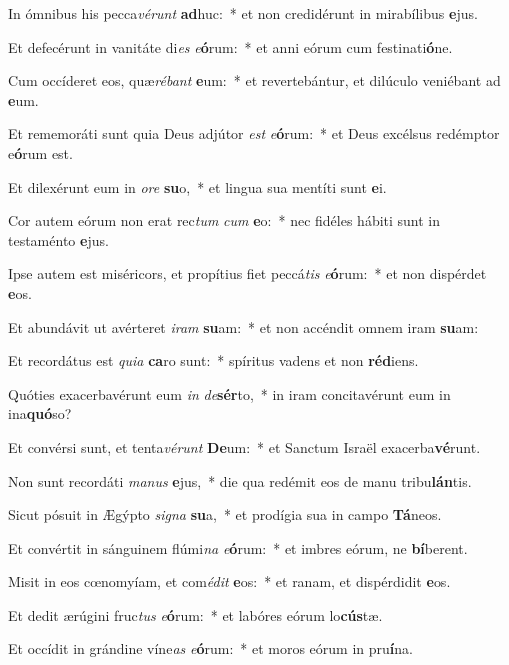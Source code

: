 \item In ómnibus his pecca\textit{vé}\textit{runt} \textbf{ad}huc:~* et non credidérunt in mirabílibus \textbf{e}jus.
\item Et defecérunt in vanitáte di\textit{es} \textit{e}\textbf{ó}rum:~* et anni eórum cum festinati\textbf{ó}ne.
\item Cum occíderet eos, quæ\textit{ré}\textit{bant} \textbf{e}um:~* et revertebántur, et dilúculo veniébant ad \textbf{e}um.
\item Et rememoráti sunt quia Deus adjútor \textit{est} \textit{e}\textbf{ó}rum:~* et Deus excélsus redémptor e\textbf{ó}rum est.
\item Et dilexérunt eum in \textit{o}\textit{re} \textbf{su}o,~* et lingua sua mentíti sunt \textbf{e}i.
\item Cor autem eórum non erat rec\textit{tum} \textit{cum} \textbf{e}o:~* nec fidéles hábiti sunt in testaménto \textbf{e}jus.
\item Ipse autem est miséricors, et propítius fiet peccá\textit{tis} \textit{e}\textbf{ó}rum:~* et non dispérdet \textbf{e}os.
\item Et abundávit ut avérteret \textit{i}\textit{ram} \textbf{su}am:~* et non accéndit omnem iram \textbf{su}am:
\item Et recordátus est \textit{qui}\textit{a} \textbf{ca}ro sunt:~* spíritus vadens et non \textbf{réd}iens.
\item Quóties exacerbavérunt eum \textit{in} \textit{de}\textbf{sér}to,~* in iram concitavérunt eum in ina\textbf{quó}so?
\item Et convérsi sunt, et tenta\textit{vé}\textit{runt} \textbf{De}um:~* et Sanctum Israël exacerba\textbf{vé}runt.
\item Non sunt recordáti \textit{ma}\textit{nus} \textbf{e}jus,~* die qua redémit eos de manu tribu\textbf{lán}tis.
\item Sicut pósuit in Ægýpto \textit{si}\textit{gna} \textbf{su}a,~* et prodígia sua in campo \textbf{Tá}neos.
\item Et convértit in sánguinem flúmi\textit{na} \textit{e}\textbf{ó}rum:~* et imbres eórum, ne \textbf{bí}berent.
\item Misit in eos cœnomyíam, et com\textit{é}\textit{dit} \textbf{e}os:~* et ranam, et dispérdidit \textbf{e}os.
\item Et dedit ærúgini fruc\textit{tus} \textit{e}\textbf{ó}rum:~* et labóres eórum lo\textbf{cús}tæ.
\item Et occídit in grándine víne\textit{as} \textit{e}\textbf{ó}rum:~* et moros eórum in pru\textbf{í}na.
